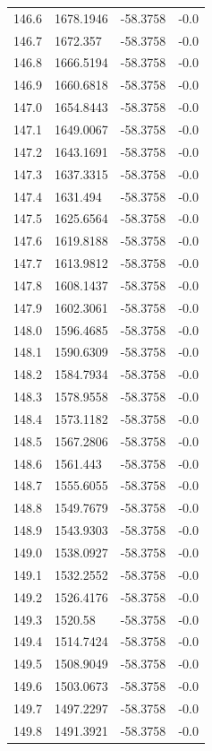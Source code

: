 \begin{table}[H]
\begin{tabular}{llll}
146.6 & 1678.1946 & -58.3758 & -0.0 \\
146.7 & 1672.357 & -58.3758 & -0.0 \\
146.8 & 1666.5194 & -58.3758 & -0.0 \\
146.9 & 1660.6818 & -58.3758 & -0.0 \\
147.0 & 1654.8443 & -58.3758 & -0.0 \\
147.1 & 1649.0067 & -58.3758 & -0.0 \\
147.2 & 1643.1691 & -58.3758 & -0.0 \\
147.3 & 1637.3315 & -58.3758 & -0.0 \\
147.4 & 1631.494 & -58.3758 & -0.0 \\
147.5 & 1625.6564 & -58.3758 & -0.0 \\
147.6 & 1619.8188 & -58.3758 & -0.0 \\
147.7 & 1613.9812 & -58.3758 & -0.0 \\
147.8 & 1608.1437 & -58.3758 & -0.0 \\
147.9 & 1602.3061 & -58.3758 & -0.0 \\
148.0 & 1596.4685 & -58.3758 & -0.0 \\
148.1 & 1590.6309 & -58.3758 & -0.0 \\
148.2 & 1584.7934 & -58.3758 & -0.0 \\
148.3 & 1578.9558 & -58.3758 & -0.0 \\
148.4 & 1573.1182 & -58.3758 & -0.0 \\
148.5 & 1567.2806 & -58.3758 & -0.0 \\
148.6 & 1561.443 & -58.3758 & -0.0 \\
148.7 & 1555.6055 & -58.3758 & -0.0 \\
148.8 & 1549.7679 & -58.3758 & -0.0 \\
148.9 & 1543.9303 & -58.3758 & -0.0 \\
149.0 & 1538.0927 & -58.3758 & -0.0 \\
149.1 & 1532.2552 & -58.3758 & -0.0 \\
149.2 & 1526.4176 & -58.3758 & -0.0 \\
149.3 & 1520.58 & -58.3758 & -0.0 \\
149.4 & 1514.7424 & -58.3758 & -0.0 \\
149.5 & 1508.9049 & -58.3758 & -0.0 \\
149.6 & 1503.0673 & -58.3758 & -0.0 \\
149.7 & 1497.2297 & -58.3758 & -0.0 \\
149.8 & 1491.3921 & -58.3758 & -0.0 \\

\end{tabular}
\end{table}
